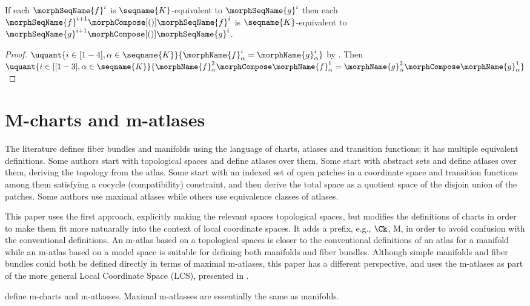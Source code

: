 \documentclass{article}
\begin{document}
\begin{lemma}
If each $\morphSeqName{f}^i$ is $\seqname{K}$-equivalent to
$\morphSeqName{g}^i$ then each
$\morphSeqName{f}^{i+1} \morphCompose[()] \morphSeqName{f}^i$ is
$\seqname{K}$-equivalent to
$\morphSeqName{g}^{i+1} \morphCompose[()] \morphSeqName{g}^i$.

\begin{proof}
$
  \uquant
    {{i \in {[1-4]}},{\alpha \in \seqname{K}}}
    {\morphName{f}^i_\alpha = \morphName{g}^i_\alpha}
$
by .
Then
$
  \uquant
    {{i \in {[[1-3]}},{\alpha \in \seqname{K}}}
    {
      \morphName{f}^2_\alpha \morphCompose \morphName{f}^1_\alpha
      =
      \morphName{g}^2_\alpha \morphCompose \morphName{g}^1_\alpha
    }
$
\end{proof}
\end{lemma}

\part{M-charts and m-atlases}
\label{part:M-charts}
The literature defines fiber bundles and manifolds using the language of
charts, atlases and transition functions; it has multiple equivalent
definitions. Some authors start with topological spaces and define
atlases over them. Some start with abstract sets and define atlases over
them, deriving the topology from the atlas. Some start with an indexed
set of open patches in a coordinate space and transition functions among
them satisfying a cocycle (compatibility) constraint, and then derive
the total space as a quotient space of the disjoin union of the patches.
Some authors use maximal atlases while others use equivalence classes of
atlases.

This paper uses the first approach, explicitly making the relevant
spaces topological spaces, but modifies the definitions of charts in
order to make them fit more natuarally into the context of local
coordinate spaces. It adds a prefix, e.g., $\Ck$, M, in order to avoid
confusion with the conventional definitions. An m-atlas based on a
topological spaces is closer to the conventional definitions of an atlas
for a manifold while an m-atlas based on a model space is suitable for
defining both manifolds and fiber bundles. Although simple manifolds and
fiber bundles could both be defined directly in terms of maximal
m-atlases, this paper has a different perspective, and uses the
m-atlases as part of the more general Local Coordinate Space (LCS),
presented in .

 define m-charts and m-atlasses.
Maximal m-atlasses are essentially the same as manifolds.
\end{document}
